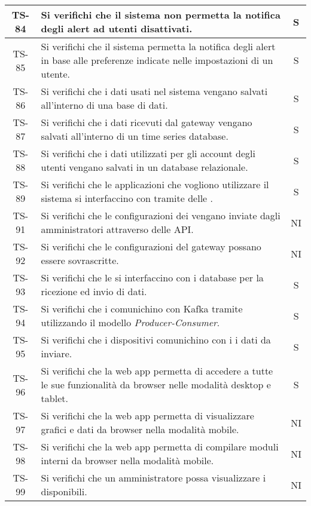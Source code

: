 \begin{center}
\begin{longtable}{|c|p{10cm}|c|}
			 \hline
			 TS-84 & Si verifichi che il sistema non permetta la notifica degli alert ad utenti disattivati. & S \\
			 \hline
			 TS-85 & Si verifichi che il sistema permetta la notifica degli alert in base alle preferenze indicate nelle impostazioni di un utente. & S \\
			 \hline
			 TS-86 & Si verifichi che i dati usati nel sistema vengano salvati all'interno di una base di dati. & S \\
			 \hline
			 TS-87 & Si verifichi che i dati ricevuti dal gateway vengano salvati all'interno di un time series database. & S \\
			 \hline
			 TS-88 & Si verifichi che i dati utilizzati per gli account degli utenti vengano salvati in un database relazionale. & S \\
			 \hline
			 TS-89 & Si verifichi che le applicazioni che vogliono utilizzare il sistema si interfaccino con \glock{Kafka} tramite delle \glock{API}. & S \\
			 \hline
			 TS-91 & Si verifichi che le configurazioni dei \glock{gateway} vengano inviate dagli amministratori attraverso delle API. & NI \\
			 \hline
			 TS-92 & Si verifichi che le configurazioni del gateway possano essere sovrascritte. & NI \\
			 \hline
			 TS-93 & Si verifichi che le \glock{API} si interfaccino con i database per la ricezione ed invio di dati. & S \\
			 \hline
			 TS-94 & Si verifichi che i \glock{gateway} comunichino con Kafka tramite \glock{topic} utilizzando il modello \textit{Producer-Consumer}. & S \\
			 \hline
			 TS-95 & Si verifichi che i dispositivi comunichino con i \glock{gateway} i dati da inviare. & S \\
			 \hline
			 TS-96 & Si verifichi che la web app permetta di accedere a tutte le sue funzionalità da browser nelle modalità desktop e tablet. & S \\
			 \hline
			 TS-97 & Si verifichi che la web app permetta di visualizzare grafici e dati da browser nella modalità mobile. & NI \\
			 \hline
			 TS-98 & Si verifichi che la web app permetta di compilare moduli interni da browser nella modalità mobile. & NI \\
			 \hline
			 TS-99 & Si verifichi che un amministratore possa visualizzare i \glock{gateway} disponibili. & NI \\

\end{longtable}
\end{center}
